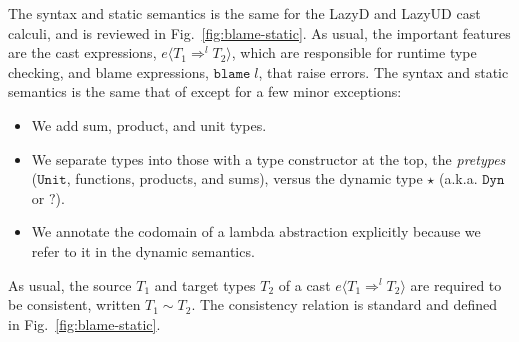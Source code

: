 \documentclass[acmsmall,review,anonymous]{acmart}\settopmatter{printfolios=true,printccs=false,printacmref=false}
\newcommand{\figref}[1]{Fig.~\ref{#1}}
\newcommand{\lazyUD}{Lazy\;UD}
\newcommand{\lazyD}{Lazy\;D}
\newcommand{\POOunit}[0]{\mathtt{Unit}}
\newcommand{\eOOcast}[4]{#1 \langle \cOOcast{#2}{#3}{#4} \rangle}
\newcommand{\eOOblame}[1]{\mathtt{blame} \; #1}
\newcommand{\cOOcast}[3]{#1 \Rightarrow^{#2} #3}
\begin{document}
The syntax and static semantics is the same for the \lazyD{} and
\lazyUD{} cast calculi, and is reviewed in \figref{fig:blame-static}.
As usual, the important features are the cast expressions,
$\eOOcast{e}{T_1}{l}{T_2}$, which are responsible for runtime type
checking, and blame expressions, $\eOOblame{l}$, that raise errors.
The syntax and static semantics is the same that of
\citet{siek2009exploring} except for a few minor exceptions:
\begin{itemize}
\item We add sum, product, and unit types.
\item We separate types into those with a type constructor at the top,
  the \emph{pretypes} ($\POOunit$, functions, products, and sums),
  versus the dynamic type $\star$ (a.k.a. $ \mathtt{Dyn} $ or
  $\mathbb{?}$).
\item We annotate the codomain of a lambda abstraction explicitly
  because we refer to it in the dynamic semantics. 
\end{itemize}
As usual, the source $T_1$ and target types $T_2$ of a cast
$\eOOcast{e}{T_1}{l}{T_2}$ are required to be consistent, written $T_1
\sim T_2$. The consistency relation is standard and defined in
\figref{fig:blame-static}.




\end{document}
